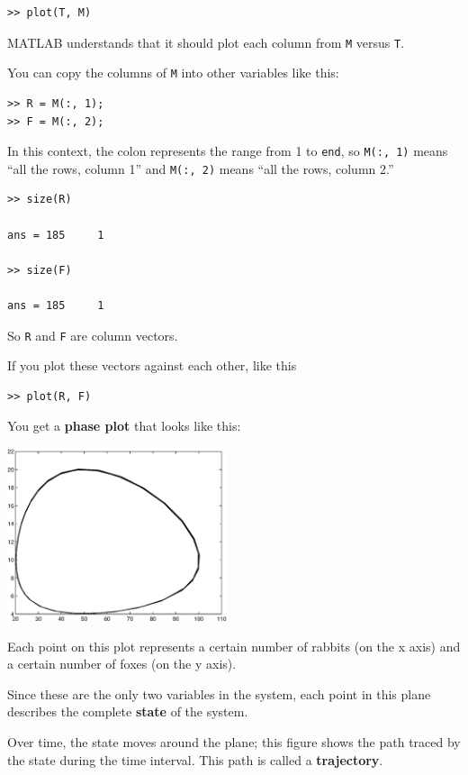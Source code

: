 \documentclass{book}
\begin{document}
\begin{verbatim}
>> plot(T, M)
\end{verbatim}

MATLAB understands that it should plot each column from {\tt M}
versus {\tt T}.

You can copy the columns of {\tt M} into other variables like
this:

\begin{verbatim}
>> R = M(:, 1);
>> F = M(:, 2);
\end{verbatim}

In this context, the colon represents the range from 1 to {\tt end},
so {\tt M(:, 1)} means ``all the rows, column 1'' and
{\tt M(:, 2)} means ``all the rows, column 2.''

\begin{verbatim}
>> size(R)

ans = 185     1

>> size(F)

ans = 185     1
\end{verbatim}

So {\tt R} and {\tt F} are column vectors.  


If you plot these
vectors against each other, like this

\begin{verbatim}
>> plot(R, F)
\end{verbatim}

You get a {\bf phase plot} that looks like this:

\beforefig \centerline{\includegraphics[height=2in]{figs/phase.eps}}

Each point on this plot represents a certain number of rabbits (on the
x axis) and a certain number of foxes (on the y axis).

Since these are the only two variables in the system, each point in
this plane describes the complete {\bf state} of the system.

Over time, the state moves around the plane; this figure shows
the path traced by the state during the time interval.  This path
is called a {\bf trajectory}.
\end{document}
